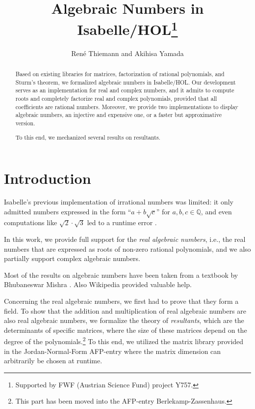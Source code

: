 \documentclass[11pt,a4paper]{article}
\newcommand\rats{\mathbb{Q}}
\newcommand\rais{real algebraic numbers\xspace}
\begin{document}
\title{Algebraic Numbers in Isabelle/HOL\footnote{Supported by FWF (Austrian Science Fund) project Y757.}}
\author{Ren\'e Thiemann and Akihisa Yamada}
\maketitle

\begin{abstract}
Based on existing libraries for matrices, factorization of rational polynomials, 
and Sturm's theorem,
we formalized algebraic numbers in Isabelle/HOL. Our development serves
as an implementation for real and complex numbers, and it admits to compute roots
and completely factorize real and complex polynomials, provided that all
coefficients are rational numbers. Moreover, we provide two implementations to display
algebraic numbers, an injective and expensive one, or a faster but approximative version.

To this end, we mechanized several results on resultants.
\end{abstract}

\tableofcontents

\section{Introduction}

Isabelle's previous implementation of irrational numbers was limited:
it only admitted numbers expressed in the form ``$a+b\sqrt{c}$'' for $a,b,c \in \rats$,
and even computations like $\sqrt2 \cdot \sqrt3$ led to a runtime error \cite{Real-AFP}.

In this work, we provide full support for the \emph{real algebraic numbers},
i.e., the real numbers that are expressed as roots of non-zero rational polynomials,
and we also partially support complex algebraic numbers.

Most of the results on algebraic numbers have been taken from a textbook 
by Bhubaneswar Mishra \cite{AlgNumbers}.
Also Wikipedia provided valuable help.

\medskip
Concerning the real algebraic numbers, we first had to prove that they form a field.
To show that the addition and multiplication of \rais are also \rais,
we formalize the theory of \emph{resultants}, which are the determinants of 
specific matrices, where the size of these matrices depend on the degree of the 
polynomials.\footnote{This part has been
moved into the AFP-entry Berlekamp-Zassenhaus.} 
To this end, we utilized the matrix library provided in the Jordan-Normal-Form
AFP-entry \cite{JNF-AFP} where the matrix dimension can arbitrarily be chosen at runtime.
\end{document}
